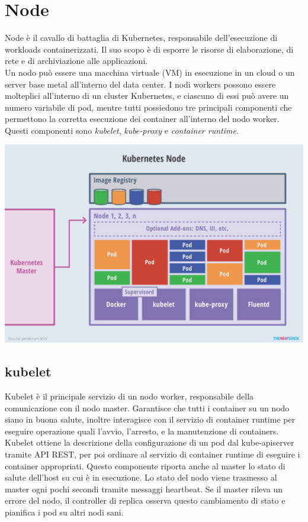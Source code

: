 \documentclass[12pt, a4paper]{report}
\begin{document}
\section{Node}
Node  è il cavallo di battaglia di Kubernetes, responsabile dell'esecuzione di workloads containerizzati. Il suo scopo è di esporre le risorse di elaborazione, di rete e di archiviazione alle applicazioni.\\
Un nodo può essere una macchina virtuale (VM) in esecuzione in un cloud o un server base metal all'interno del data center.
I nodi workers possono essere molteplici all'interno di un cluster Kubernetes, e ciascuno di essi può avere un numero variabile di pod, mentre tutti possiedono tre principali componenti che permettono la corretta esecuzione dei container all'interno del nodo worker. Questi componenti sono \textit{kubelet}, \textit{kube-proxy} e \textit{container runtime}.
\begin{center}
  \includegraphics[scale=0.5]{Images/Kubernetes-workers}
\end{center}
\subsection{kubelet}
Kubelet è il principale servizio di un nodo worker, responsabile della comunicazione con il nodo master. Garantisce che tutti i container su un nodo siano in buona salute, inoltre interagisce con il servizio di container runtime per eseguire operazione quali l'avvio, l'arresto, e la manutenzione di containers. Kubelet ottiene la descrizione della configurazione di un pod dal kube-apiserver tramite API REST, per poi ordinare al servizio di container runtime di eseguire i container appropriati. Questo componente riporta anche al master lo stato di salute dell'host su cui è in esecuzione. Lo stato del nodo viene trasmesso al master ogni pochi secondi tramite messaggi heartbeat. Se il master rileva un errore del nodo, il controller di replica osserva questo cambiamento di stato e pianifica i pod su altri nodi sani.
\end{document}
